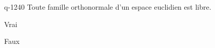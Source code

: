 \begin{truefalse}{q-1240}
Toute famille orthonormale d'un espace euclidien est libre.
\item* Vrai
\item Faux
\end{truefalse}

